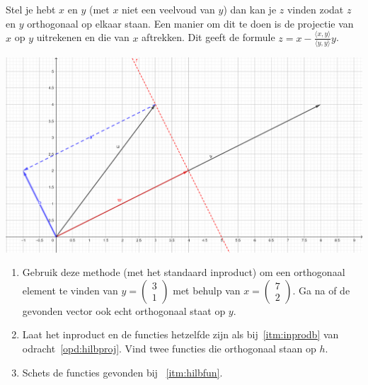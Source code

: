 \documentclass[../main.tex]{subfiles}
\begin{document}
\begin{opdrachtlang}
Stel je hebt $x$ en $y$ (met $x$ niet een veelvoud van $y$) dan kan je $z$ vinden zodat $z$ en $y$ orthogonaal op elkaar staan. Een manier om dit te doen is de projectie van $x$ op $y$ uitrekenen en die van $x$ aftrekken. Dit geeft de formule $z=x-\frac{\langle x,y\rangle}{\langle y,y\rangle}y$.

\begin{minipage}{\textwidth}
    \includegraphics[width=.95\textwidth]{./img/projectie 2.png}
\end{minipage}
\vspace{.5cm}




\begin{enumerate}
    \item Gebruik deze methode (met het standaard inproduct) om een orthogonaal element te vinden van $y=\begin{pmatrix}3\\1\end{pmatrix}$ met behulp van $x=\begin{pmatrix}7\\2\end{pmatrix}$. Ga na of de gevonden vector ook echt orthogonaal staat op $y$.
\item\label{itm:hilbfun} Laat het inproduct en de functies hetzelfde zijn als bij~\ref{itm:inprodb} van odracht~\ref{opd:hilbproj}. Vind twee functies die orthogonaal staan op $h$.\\
\item Schets de functies gevonden bij ~\ref{itm:hilbfun}.
\end{enumerate}
\end{opdrachtlang}
\end{document}
